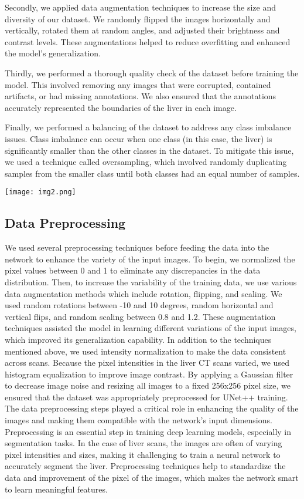 \documentclass[conference]{IEEEtran}
\begin{document}
Secondly, we applied data augmentation techniques to increase the size and diversity of our dataset. We randomly flipped the images horizontally and vertically, rotated them at random angles, and adjusted their brightness and contrast levels. These augmentations helped to reduce overfitting and enhanced the model’s generalization.

Thirdly, we performed a thorough quality check of the dataset before training the model. This involved removing any images that were corrupted, contained artifacts, or had missing annotations. We also ensured that the annotations accurately represented the boundaries of the liver in each image.

Finally, we performed a balancing of the dataset to address any class imbalance issues. Class imbalance can occur when one class (in this case, the liver) is significantly smaller than the other classes in the dataset. To mitigate this issue, we used a technique called oversampling, which involved randomly duplicating samples from the smaller class until both classes had an equal number of samples.


\texttt{[image: img2.png]}

\subsection{Data Preprocessing}\label{SCM}
We used several preprocessing techniques before feeding the data into the network to enhance the variety of the input images. To begin, we normalized the pixel values between 0 and 1 to eliminate any discrepancies in the data distribution. Then, to increase the variability of the training data, we use various data augmentation methods which include rotation, flipping, and scaling. We used random rotations between -10 and 10 degrees, random horizontal and vertical flips, and random scaling between 0.8 and 1.2. These augmentation techniques assisted the model in learning different variations of the input images, which improved its generalization capability.
In addition to the techniques mentioned above, we used intensity normalization to make the data consistent across scans. Because the pixel intensities in the liver CT scans varied, we used histogram equalization to improve image contrast. By applying a Gaussian filter to decrease image noise and resizing all images to a fixed 256x256 pixel size, we ensured that the dataset was appropriately preprocessed for UNet++ training. The data preprocessing steps played a critical role in enhancing the quality of the images and making them compatible with the network's input dimensions.
Preprocessing is an essential step in training deep learning models, especially in segmentation tasks. In the case of liver scans, the images are often of varying pixel intensities and sizes, making it challenging to train a neural network to accurately segment the liver. Preprocessing techniques help to standardize the data and improvement of the pixel of the images, which makes the network smart to learn meaningful features.
\end{document}
